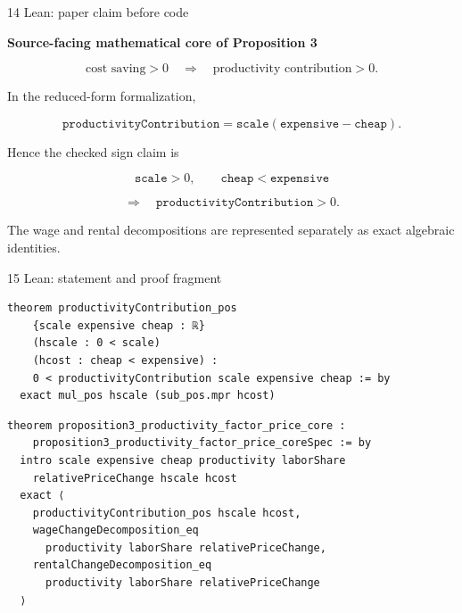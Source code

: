 \documentclass[aspectratio=169,11pt]{beamer}
\begin{document}
\begin{frame}{14 \textperiodcentered{} Lean: paper claim before code}

  \textbf{Source-facing mathematical core of Proposition 3}

  \[
    \text{cost saving}>0
    \quad\Longrightarrow\quad
    \text{productivity contribution}>0.
  \]

  In the reduced-form formalization,

  \[
    \texttt{productivityContribution}
    =
    \texttt{scale}
    \left(
      \texttt{expensive}-\texttt{cheap}
    \right).
  \]

  Hence the checked sign claim is

  \[
    \texttt{scale}>0,
    \qquad
    \texttt{cheap}<\texttt{expensive}
  \]

  \[
    \Longrightarrow
    \quad
    \texttt{productivityContribution}>0.
  \]

  The wage and rental decompositions are represented separately
  as exact algebraic identities.

\end{frame}


\begin{frame}[fragile]{15 \textperiodcentered{} Lean: statement and proof fragment}

\begin{lstlisting}
theorem productivityContribution_pos
    {scale expensive cheap : ℝ}
    (hscale : 0 < scale)
    (hcost : cheap < expensive) :
    0 < productivityContribution scale expensive cheap := by
  exact mul_pos hscale (sub_pos.mpr hcost)
\end{lstlisting}

\vspace{0.3em}

\begin{lstlisting}
theorem proposition3_productivity_factor_price_core :
    proposition3_productivity_factor_price_coreSpec := by
  intro scale expensive cheap productivity laborShare
    relativePriceChange hscale hcost
  exact ⟨
    productivityContribution_pos hscale hcost,
    wageChangeDecomposition_eq
      productivity laborShare relativePriceChange,
    rentalChangeDecomposition_eq
      productivity laborShare relativePriceChange
  ⟩
\end{lstlisting}

\end{frame}
\end{document}
